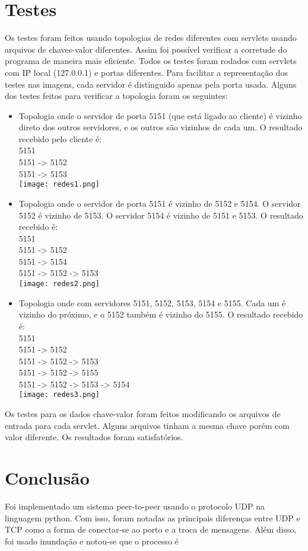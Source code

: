 \documentclass[10pt]{article}
\begin{document}
		\section{Testes}
			Os testes foram feitos usando topologias de redes diferentes com servlets usando arquivos de chaves-valor diferentes. Assim foi possível verificar a corretude do programa de maneira mais eficiente.
			\newline Todos os testes foram rodados com servlets com IP local (127.0.0.1) e portas diferentes. Para facilitar a representação dos testes nas imagens, cada servidor é distinguido apenas pela porta usada. Alguns dos testes feitos para verificar a topologia foram os seguintes:
			\begin{itemize}
			    \item Topologia onde o servidor de porta 5151 (que está ligado ao cliente) é vizinho direto dos outros servidores, e os outros são vizinhos de cada um. O resultado recebido pelo cliente é: \\ 5151 \\ 5151 -> 5152 \\ 5151 -> 5153 \\ \texttt{[image: redes1.png]}
			    \item Topologia onde o servidor de porta 5151 é vizinho de 5152 e 5154. O servidor 5152 é vizinho de 5153. O servidor 5154 é vizinho de 5151 e 5153. O resultado recebido é: \\ 5151 \\ 5151 -> 5152 \\ 5151 -> 5154 \\ 5151 -> 5152 -> 5153 \\
			   \texttt{[image: redes2.png]}
			   \item Topologia onde com servidores 5151, 5152, 5153, 5154 e 5155. Cada um é vizinho do próximo, e o 5152 também é vizinho do 5155. O resultado recebido é: \\ 5151 \\ 5151 -> 5152 \\ 5151 -> 5152 -> 5153 \\ 5151 -> 5152 -> 5155 \\ 5151 -> 5152 -> 5153 -> 5154 \\
			   \texttt{[image: redes3.png]}
			\end{itemize}
			Os testes para os dados chave-valor foram feitos modificando os arquivos de entrada para cada servlet. Alguns arquivos tinham a mesma chave porém com valor diferente. Os resultados foram satisfatórios.
		\section{Conclusão} 
			Foi implementado um sistema peer-to-peer usando o protocolo UDP na linguagem python. Com isso, foram notadas as principais diferenças entre UDP e TCP como a forma de conectar-se ao porto e a troca de mensagens. Além disso, foi usado inundação e notou-se que o processo é 
\end{document}
